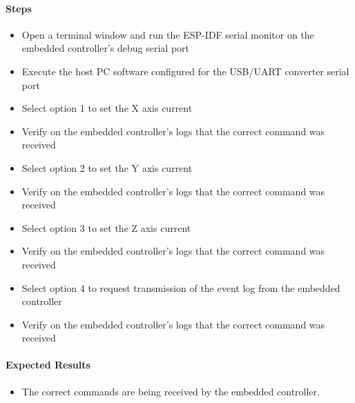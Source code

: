 \documentclass[10pt,twocolumn,letterpaper]{article}
\begin{document}
\paragraph{Steps}
\begin{itemize}
  \item Open a terminal window and run the ESP-IDF serial monitor on the embedded controller's debug serial port
  \item Execute the host PC software configured for the USB/UART converter serial port
  \item Select option 1 to set the X axis current
  \item Verify on the embedded controller's logs that the correct command was received
  \item Select option 2 to set the Y axis current
  \item Verify on the embedded controller's logs that the correct command was received
  \item Select option 3 to set the Z axis current
  \item Verify on the embedded controller's logs that the correct command was received
  \item Select option 4 to request transmission of the event log from the embedded controller
  \item Verify on the embedded controller's logs that the correct command was received
\end{itemize}

\paragraph{Expected Results}

\begin{itemize}
  \item The correct commands are being received by the embedded controller.
\end{itemize}
\end{document}

